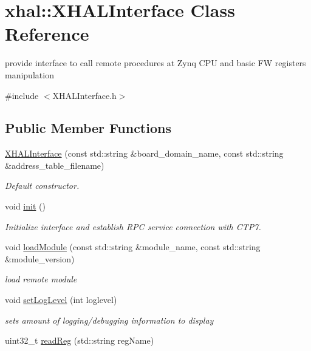 \hypertarget{classxhal_1_1XHALInterface}{
\section{xhal::XHALInterface Class Reference}
\label{classxhal_1_1XHALInterface}
}


provide interface to call remote procedures at Zynq CPU and basic FW registers manipulation  


{\ttfamily \#include $<$XHALInterface.h$>$}\subsection*{Public Member Functions}
\begin{DoxyCompactItemize}
\item 
\hyperlink{classxhal_1_1XHALInterface_ac44129acadc38854d639e1dfa6fd6d92}{XHALInterface} (const std::string \&board\_\-domain\_\-name, const std::string \&address\_\-table\_\-filename)
\begin{DoxyCompactList}\small\item\em Default constructor. \item\end{DoxyCompactList}\item 
void \hyperlink{classxhal_1_1XHALInterface_a37d127d6a407b73b9746de85d2bf5232}{init} ()
\begin{DoxyCompactList}\small\item\em Initialize interface and establish RPC service connection with CTP7. \item\end{DoxyCompactList}\item 
\hypertarget{classxhal_1_1XHALInterface_a72be46ae2e48c36377c37aec4968b6a1}{
void \hyperlink{classxhal_1_1XHALInterface_a72be46ae2e48c36377c37aec4968b6a1}{loadModule} (const std::string \&module\_\-name, const std::string \&module\_\-version)}
\label{classxhal_1_1XHALInterface_a72be46ae2e48c36377c37aec4968b6a1}

\begin{DoxyCompactList}\small\item\em load remote module \item\end{DoxyCompactList}\item 
void \hyperlink{classxhal_1_1XHALInterface_af04487e30a68e8d479d8ae2ad7d0fc81}{setLogLevel} (int loglevel)
\begin{DoxyCompactList}\small\item\em sets amount of logging/debugging information to display \item\end{DoxyCompactList}\item 
\hypertarget{classxhal_1_1XHALInterface_a06882bc51142d2eaf54a3980ee5c9ead}{
uint32\_\-t \hyperlink{classxhal_1_1XHALInterface_a06882bc51142d2eaf54a3980ee5c9ead}{readReg} (std::string regName)}
\label{classxhal_1_1XHALInterface_a06882bc51142d2eaf54a3980ee5c9ead}


\end{DoxyCompactItemize}
